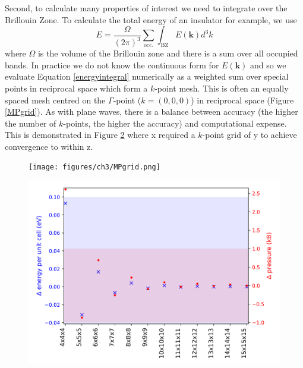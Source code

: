 Second, to calculate many properties of interest we need to integrate over the Brillouin Zone. To calculate the total energy of an insulator for example, we use
\begin{equation} \label{energyintegral}
    E = \frac{\Omega}{(2\pi)^3}\sum_\textrm{occ.}\int_\textrm{BZ}E(\textbf{k})d^3k
\end{equation}
where $\Omega$ is the volume of the Brillouin zone and there is a sum over all occupied bands. 
In practice we do not know the continuous form for $E(\textbf{k})$ and so we evaluate Equation \ref{energyintegral} numerically as a weighted sum over special points in reciprocal space which form a $k$-point mesh. This is often an equally spaced mesh centred on the $\Gamma$-point ($k=(0,0,0)$) in reciprocal space (Figure \ref{MPgrid}). As with plane waves, there is a balance between accuracy (the higher the number of $k$-points, the higher the accuracy) and computational expense. This is demonstrated in Figure \ref{kpointconvergence} where x required a $k$-point grid of y to achieve convergence to within z.

\begin{figure}[h]
\centering
  \texttt{[image: figures/ch3/MPgrid.png]}
  \caption[]{} 
  \label{mPgrid}
\end{figure}


\begin{figure}[h]
\centering
  \includegraphics[width=1.0\columnwidth]{figures/ch3/kpointconvergence.png}
  \caption[]{} 
  \label{kpointconvergence}
\end{figure}


